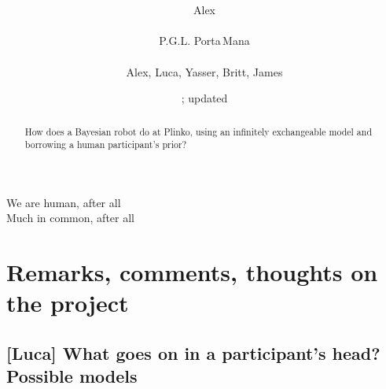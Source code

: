 \documentclass[\ifafour a4paper,12pt,\else a5paper,10pt,\fi%
onecolumn,oneside,article,%
british%
]{memoir}
\title{\propertitle%
}
\author{\ifpublic\hspace*{\stretch{1}}%
\parbox[t]{0.3\linewidth}{\protect\centering%
Alex\\%
{\footnotesize\epost{\email{alsfilip}{mail.med.penn.edu}}}}%
\hspace*{\stretch{1}}%
\parbox[t]{0.3\linewidth}{\protect\centering%
P.G.L. Porta\,Mana\\%
{\footnotesize%
\epost{\email{pgl}{portamana.org}}}%
}%
\hspace*{\stretch{1}}%
\else Alex, Luca, Yasser, Britt, James%
\fi}
\date{\firstdraft; updated \updated}
\theoremstyle{remark}
\theoremstyle{innote}
\newcommand*{\citep}{\parencites}
\newcommand*{\asudedication}[1]{%
{\par\centering\textit{#1}\par}}
\renewcommand*{\|}{\mathpunct{|}}
\begin{document}
\captiondelim{\quad}\captionnamefont{\footnotesize}\captiontitlefont{\footnotesize}
\frenchspacing

\maketitle
\ifpublic
\abstractrunin
\abslabeldelim{}
\renewcommand*{\abstractname}{}
\setlength{\absleftindent}{0pt}
\setlength{\absrightindent}{0pt}
\setlength{\abstitleskip}{-\absparindent}
\begin{abstract}%
  \noindent How does a Bayesian robot do at Plinko, using an infinitely
  exchangeable model and borrowing a human participant's prior?
\end{abstract}\fi

\frenchspacing

\setlength{\epigraphwidth}{.6\columnwidth}
\epigraphfontsize{\footnotesize}
\setlength{\epigraphrule}{0pt}
\setlength{\beforeepigraphskip}{0pt}
\setlength{\afterepigraphskip}{0pt}
\epigraph{We are human, after all\\
  Much in common, after all}{\citep{daftpunk2005b}}




\section{Remarks, comments, thoughts on the project}
\label{sec:method_remarks}

\subsection{[Luca] What goes on in a participant's head? Possible models}
\end{document}
